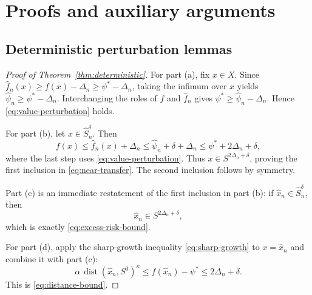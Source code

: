 \documentclass[11pt]{article}
\begin{document}
\appendix

\section{Proofs and auxiliary arguments}

\label{app:proofs}

\subsection{Deterministic perturbation lemmas}
\begin{proof}[Proof of Theorem~\ref{thm:deterministic}]
For part (a), fix $x\in X$. Since $\hat{f}_{n}(x)\ge f(x)-\Delta_{n}\ge\psi^{*}-\Delta_{n}$,
taking the infimum over $x$ yields $\hat{\psi}_{n}\ge\psi^{*}-\Delta_{n}$.
Interchanging the roles of $f$ and $\hat{f}_{n}$ gives $\psi^{*}\ge\hat{\psi}_{n}-\Delta_{n}$.
Hence \eqref{eq:value-perturbation} holds.

For part (b), let $x\in\hat{S}_{n}^{\delta}$. Then 
\[
f(x)\le\hat{f}_{n}(x)+\Delta_{n}\le\hat{\psi}_{n}+\delta+\Delta_{n}\le\psi^{*}+2\Delta_{n}+\delta,
\]
where the last step uses \eqref{eq:value-perturbation}. Thus $x\in S^{2\Delta_{n}+\delta}$,
proving the first inclusion in \eqref{eq:near-transfer}. The second
inclusion follows by symmetry.

Part (c) is an immediate restatement of the first inclusion in part
(b): if $\hat{x}_{n}\in\hat{S}_{n}^{\delta}$, then 
\[
\hat{x}_{n}\in S^{2\Delta_{n}+\delta},
\]
which is exactly \eqref{eq:excess-risk-bound}.

For part (d), apply the sharp-growth inequality \eqref{eq:sharp-growth}
to $x=\hat{x}_{n}$ and combine it with part (c): 
\[
\alpha\,\operatorname{dist}(\hat{x}_{n},S^{0})^{\kappa}\le f(\hat{x}_{n})-\psi^{*}\le2\Delta_{n}+\delta.
\]
This is \eqref{eq:distance-bound}. 
\end{proof}
%
\end{document}
